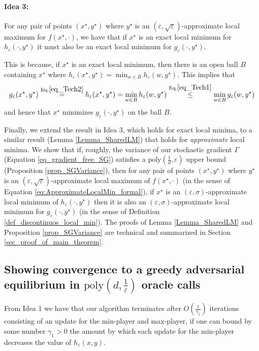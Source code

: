 \documentclass[11pt,letterpaper]{article}
\renewcommand{\epsilon}{\varepsilon}
\begin{document}
\paragraph{Idea 3:}
% 
%
 For any pair of points $(x^\star, y^\star)$ where $y^\star$ is an $(\epsilon, \sqrt{\epsilon})$-approximate local maximum for $f(x^\star, \cdot)$, we have that if $x^\star$ is an exact local minimum for $h_\epsilon(\cdot, y^\star)$ it must also be an exact local minimum for $g_\epsilon(\cdot, y^\star)$.
%

 This is because, if $x^\star$ is an exact local minimum, then there is an open ball $B$ containing $x^\star$ where $h_\epsilon(x^\star, y^\star) = \min_{w \in B} h_\epsilon(w, y^\star)$.
%
This implies that
\begin{equation}
g_\epsilon(x^\star, y^\star) \stackrel{\textrm{Eq.}\eqref{eq_Tech2}}{=} h_\epsilon(x^\star, y^\star) = \min_{w \in B} h_\epsilon(w, y^\star)
%
\stackrel{\textrm{Eq.}\eqref{eq_Tech1}}{\leq} \min_{w \in B} g_\epsilon(w, y^\star) 
\end{equation}
and hence that $x^\star$ minimizes $g_\epsilon(\cdot, y^\star)$ on the ball $B$.
%

Finally, we extend the result in Idea 3, which holds for exact local minima, to a similar result (Lemma \ref{Lemma_SharedLM}) that holds for {\em approximate} local minima.
%
 We show that if, roughly, the variance of our stochastic gradient $\Gamma$ (Equation \eqref{eq_gradient_free_SG}) satisfies a $\mathrm{poly}(\frac{1}{d}, \epsilon)$ upper bound (Proposition \ref{prop_SGVariance}), then for any pair of points $(x^\star, y^\star)$ where $y^\star$ is an $(\epsilon, \sqrt{\epsilon})$-approximate local maximum of $f(x^\star, \cdot)$ (in the sense of Equation \eqref{eq:ApproximateLocalMin_formal}), if $x^\star$ is an $(\epsilon, \sigma)$-approximate local minimum of $h_\epsilon(\cdot, y^\star)$ then it is also an $(\epsilon, \sigma)$-approximate local minimum for $g_\epsilon(\cdot, y^\star)$ (in the sense of Definition \ref{def_discontinuos_local_min}).
%
 The proofs of Lemma \ref{Lemma_SharedLM} and Proposition \ref{prop_SGVariance} are technical and summarized in Section \ref{sec_proof_of_main_theorem}.
%
%

\subsection{Showing convergence to a greedy adversarial equilibrium in $\mathrm{poly}\left(d, \frac{1}{\epsilon}\right)$ oracle calls} \label{sec_runtime}
%
From Idea 1 we have that our algorithm terminates after $O\left(\frac{1}{\gamma_1}\right)$ iterations consisting of an update for the min-player and max-player, if one can bound by some number $\gamma_1>0$ the amount by which each update for the min-player decreases the value of $h_\epsilon(x,y)$.
\end{document}
